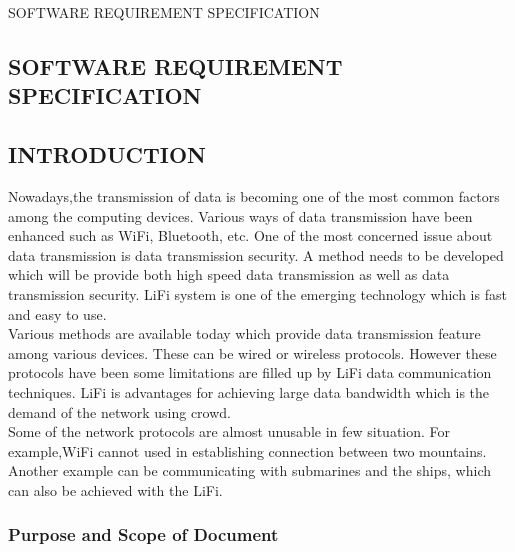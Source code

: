 \documentclass[12pt,a4paper]
{article}
\numberwithin{table}{section}
\begin{document}
{{{{{\begin{minipage}{15cm}
\begin{center}
\begin{Huge}
\vspace{0.5 in}
SOFTWARE REQUIREMENT SPECIFICATION
\end{Huge}

\end{center}
\end{minipage}

\newpage
\begin{center}
\section{SOFTWARE REQUIREMENT SPECIFICATION }
\end{center}
 {\setlength{\baselineskip}{1.0\baselineskip} 		
  \vspace{0.1in}


\subsection{INTRODUCTION}

\hspace{10 pt}	Nowadays,the transmission of data is becoming one of the most common factors among the computing devices. Various ways of data transmission have been enhanced such as WiFi, Bluetooth, etc. One of the most concerned issue about data transmission is data transmission security. A method needs to be developed which  will be provide both high speed data transmission as well as data transmission security. LiFi system is one of the emerging technology which is fast and easy to use.\\

\hspace{10 pt}Various methods are available today which provide data transmission feature among various devices. These can be wired or wireless protocols. However these protocols have been some limitations are filled up by LiFi data communication techniques. LiFi is advantages for achieving large data bandwidth which is the demand of the network using crowd.\\

\hspace{10 pt}Some of the network protocols are almost unusable in few situation. For example,WiFi cannot used in establishing connection between two mountains. Another example can be communicating with submarines and the ships, which can also be achieved with the LiFi.
\newpage
\subsubsection{Purpose and Scope of Document}

}}}}}}
\end{document}
